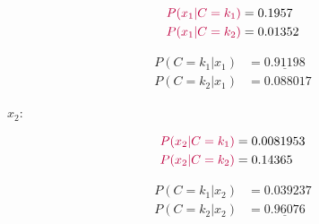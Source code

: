 \documentclass[12pt]{article}
\begin{document}
\begin{enumerate}[leftmargin=\labelsep]
\begin{enumerate}[leftmargin=\labelsep]
\begin{paracol}{3}
                  \begin{normalsize}
                    \begin{equation*}
                      \begin{aligned}
                        \textcolor{purple}{P(x_1 | C = k_1)} & = 0.1957  \\
                        \textcolor{purple}{P(x_1 | C = k_2)} & = 0.01352
                      \end{aligned}
                    \end{equation*}

                    \begin{equation*}
                      \begin{aligned}
                        P(C = k_1 | x_1) & = \underline{0.91198} \\
                        P(C = k_2 | x_1) & = 0.088017
                      \end{aligned}
                    \end{equation*}
                  \end{normalsize}

                  \switchcolumn

                  $x_2$:

                  \begin{normalsize}
                    \begin{equation*}
                      \begin{aligned}
                        \textcolor{purple}{P(x_2 | C = k_1)} & = 0.0081953 \\
                        \textcolor{purple}{P(x_2 | C = k_2)} & = 0.14365
                      \end{aligned}
                    \end{equation*}

                    \begin{equation*}
                      \begin{aligned}
                        P(C = k_1 | x_2) & = 0.039237            \\
                        P(C = k_2 | x_2) & = \underline{0.96076}
                      \end{aligned}
                    \end{equation*}
                  \end{normalsize}

                  \switchcolumn


\end{paracol}
\end{enumerate}
\end{enumerate}
\end{document}

